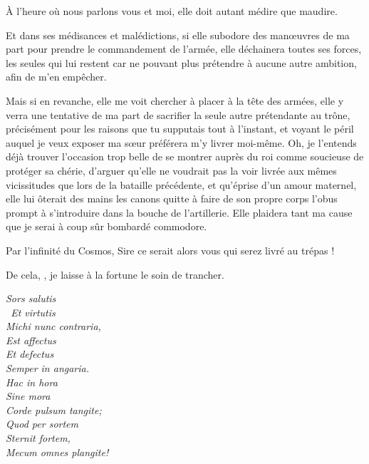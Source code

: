 \begin{drama}
  \alexasspeaks À l’heure où nous parlons vous et moi, elle doit autant médire que maudire.

   \elenaspeaks Et dans ses médisances et malédictions, si elle subodore des manœuvres de ma part pour prendre le commandement de l’armée, elle déchainera toutes ses forces, les seules qui lui restent car ne pouvant plus prétendre à aucune autre ambition, afin de m’en empêcher.

  Mais si en revanche, elle me voit chercher à placer \ela{} à la tête des armées, elle y verra une tentative de ma part de sacrifier la seule autre prétendante au trône, précisément pour les raisons que tu supputais tout à l’instant, et voyant le péril auquel je veux exposer ma sœur préférera m’y livrer moi-même. Oh, je l’entends déjà trouver l’occasion trop belle de se montrer auprès du roi comme soucieuse de protéger sa \princesse{} chérie, d’arguer qu’elle ne voudrait pas la voir livrée aux mêmes vicissitudes que lors de la bataille précédente, et qu’éprise d’un amour maternel, elle lui ôterait des mains les canons quitte à faire de son propre corps l’obus prompt à s’introduire dans la bouche de l’artillerie. Elle plaidera tant ma cause que je serai à coup sûr bombardé commodore.

  \alexasspeaks Par l’infinité du Cosmos, Sire ce serait alors vous qui serez livré au trépas !

  \elenaspeaks  De cela, \alexas, je laisse à la fortune le soin de trancher.

%


  \choirspeaks
  \begin{minipage}[t]{\linewidth}
    \em
    Sors salutis\endnote{\carminaendnote}\\\
    Et virtutis\\
    Michi nunc contraria,\\
    Est affectus\\
    Et defectus\\
    Semper in angaria.\\
    Hac in hora\\
    Sine mora\\
    Corde pulsum tangite;\\
    Quod per sortem\\
    Sternit fortem,\\
    Mecum omnes plangite!
  \end{minipage}



\end{drama}

